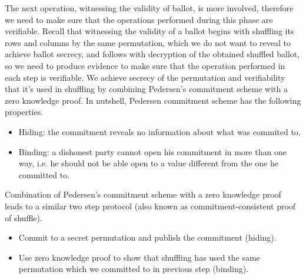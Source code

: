\documentclass{llncs}
\begin{document}
The next operation, witnessing the validity of ballot, 
is more involved, therefore we need to make 
sure that the operations performed during this phase are verifiable. 
Recall that witnessing 
the validity of a ballot begins with shuffling its rows and columns 
by the same permutation, which
we do not want to reveal to achieve ballot secrecy, and follows with 
decryption  of the obtained shuffled ballot, so 
we need to produce evidence 
to make sure that the operation performed in each step 
is verifiable. We achieve secrecy of the permutation and 
verifiability that it's used in shuffling by combining 
Pedersen's commitment \cite{Pederson} scheme with a zero knowledge proof.
In nutshell, Pedersen commitment scheme has the following properties. 
\begin{itemize}
\item Hiding: the commitment reveals no information about what was commited to.
\item Binding: a dishonest party cannot open his commitment in more  
	 	than one way, i.e. he should not be able open to a value 
	 	different from the one he committed to.
\end{itemize}

Combination of Pedersen's commitment scheme 
with a zero knowledge proof leads to a similar two step protocol (also known 
as commitment-consistent proof of shuffle)\cite{Wikstrom:2009:CPS}.

\begin{itemize}
\item Commit to a secret permutation and publish the commitment (hiding).
\item Use zero knowledge proof to show that shuffling has used 
      the same permutation which we committed to in previous step (binding).
\end{itemize}  
\end{document}
